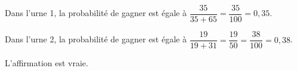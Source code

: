 %
%
%
Dans l’urne 1, la probabilité de gagner est égale à $\dfrac{35}{35+65} = \dfrac{35}{100} = 0,35$.

Dans l’urne 2, la probabilité de gagner est égale à $\dfrac{19}{19+31} = \dfrac{19}{50} = \dfrac{38}{100} =  0,38$.

L’affirmation est vraie.

\vspace{0,5cm}

